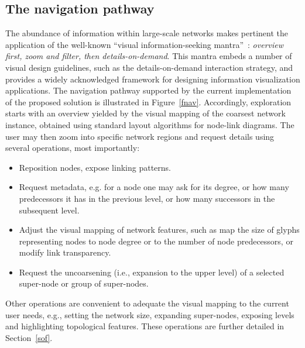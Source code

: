 \documentclass[runningheads]{llncs}
\begin{document}
\subsection{The navigation pathway}\label{nav}
The abundance of information within large-scale networks makes pertinent the
application of the well-known ``visual information-seeking mantra''~\cite{shneiderman1996eyes}:
\emph{overview first, zoom and filter, then details-on-demand}.
This mantra embeds a number of visual design guidelines,
such as the details-on-demand interaction strategy, and provides
a widely acknowledged framework for designing information visualization applications. The navigation pathway supported by the current implementation of the proposed solution is illustrated in Figure~\ref{fnav}.
Accordingly, exploration starts with an overview yielded by the visual mapping of the coarsest network instance, obtained using standard layout algorithms for node-link diagrams.
The user may then zoom into specific network regions and request
details using several operations, most importantly:
\begin{itemize}
  \item Reposition nodes, expose linking patterns.
  \item Request metadata, e.g. for a node one may ask for its degree, or how many predecessors it has in the previous level, or how many successors in the subsequent level.
  \item Adjust the visual mapping of network features, such as map the size of glyphs representing nodes to node degree or to the number of node predecessors, or modify link transparency.
  \item Request the uncoarsening (i.e., expansion to the upper level) of a selected super-node or group of super-nodes.
\end{itemize}

Other operations are convenient to adequate the visual mapping to the current user needs, e.g., setting the network size, expanding super-nodes, exposing levels and highlighting topological features. These operations are further detailed in Section~\ref{sof}.
\end{document}
